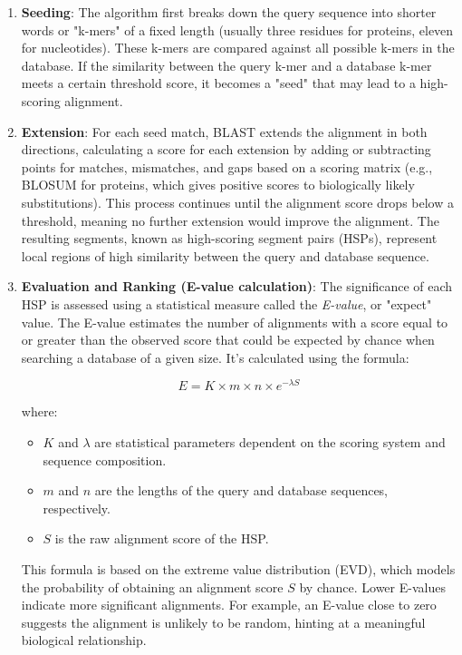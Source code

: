 \begin{enumerate}
    \item \textbf{Seeding}: The algorithm first breaks down the query sequence into shorter words or "k-mers" of a fixed length (usually three residues for proteins, eleven for nucleotides). These k-mers are compared against all possible k-mers in the database. If the similarity between the query k-mer and a database k-mer meets a certain threshold score, it becomes a "seed" that may lead to a high-scoring alignment.
    
    \item \textbf{Extension}: For each seed match, BLAST extends the alignment in both directions, calculating a score for each extension by adding or subtracting points for matches, mismatches, and gaps based on a scoring matrix (e.g., BLOSUM for proteins, which gives positive scores to biologically likely substitutions). This process continues until the alignment score drops below a threshold, meaning no further extension would improve the alignment. The resulting segments, known as high-scoring segment pairs (HSPs), represent local regions of high similarity between the query and database sequence.
    
    \item \textbf{Evaluation and Ranking (E-value calculation)}: The significance of each HSP is assessed using a statistical measure called the \textit{E-value}, or "expect" value. The E-value estimates the number of alignments with a score equal to or greater than the observed score that could be expected by chance when searching a database of a given size. It’s calculated using the formula:

    \[
    E = K \times m \times n \times e^{-\lambda S}
    \]

    where:
    \begin{itemize}
        \item \( K \) and \( \lambda \) are statistical parameters dependent on the scoring system and sequence composition.
        \item \( m \) and \( n \) are the lengths of the query and database sequences, respectively.
        \item \( S \) is the raw alignment score of the HSP.
    \end{itemize}

    This formula is based on the extreme value distribution (EVD), which models the probability of obtaining an alignment score \( S \) by chance. Lower E-values indicate more significant alignments. For example, an E-value close to zero suggests the alignment is unlikely to be random, hinting at a meaningful biological relationship.
\end{enumerate}


